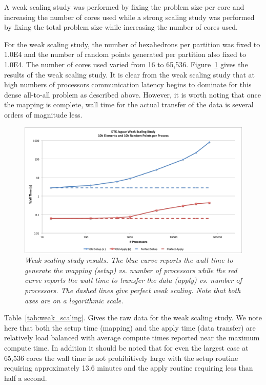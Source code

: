 \documentclass{mc2013}
\begin{document}
A weak scaling study was performed by fixing the problem size per core
and increasing the number of cores used while a strong scaling study
was performed by fixing the total problem size while increasing the
number of cores used.

\label{subsec:weak_scaling}
For the weak scaling study, the number of hexahedrons per partition
was fixed to 1.0E4 and the number of random points generated per
partition also fixed to 1.0E4. The number of cores used varied from 16
to 65,536. Figure~\ref{fig:weak_scaling} gives the results of the weak
scaling study. It is clear from the weak scaling study that at high
numbers of processors communication latency begins to dominate for
this dense all-to-all problem as described above. However, it is worth
noting that once the mapping is complete, wall time for the actual
transfer of the data is several orders of magnitude less.

\begin{figure}[htpb!]
  \centering
  \includegraphics[width=5.5in]{WeakScaling.png}
  \caption{\sl Weak scaling study results. The blue curve reports the
    wall time to generate the mapping (setup) vs. number of processors
    while the red curve reports the wall time to transfer the data
    (apply) vs. number of processors. The dashed lines give perfect
    weak scaling. Note that both axes are on a logarithmic scale. }
  \label{fig:weak_scaling}
\end{figure}

Table~\ref{tab:weak_scaling}. Gives the raw data for the weak scaling
study. We note here that both the setup time (mapping) and the apply
time (data transfer) are relatively load balanced with average compute
times reported near the maximum compute time. In addition it should be
noted that for even the largest case at 65,536 cores the wall time is
not prohibitively large with the setup routine requiring approximately
13.6 minutes and the apply routine requiring less than half a second.
\end{document}

